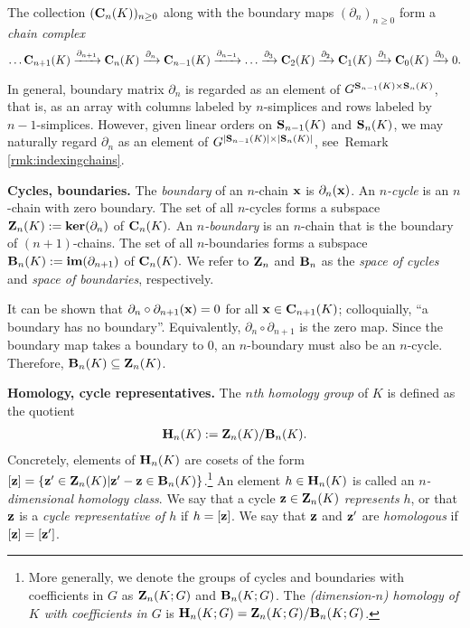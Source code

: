  
The collection  $(\mathbf{C}_n(K))_{n\geq 0}$ along with the boundary maps $(\partial_n)_{n\geq 0}$ form a \textit{chain complex}
\[\ldots \mathbf{C}_{n+1}(K) \xrightarrow{\partial_{n+1}} \mathbf{C}_{n}(K) \xrightarrow{\partial_{n}} \mathbf{C}_{n-1}(K) \xrightarrow{\partial_{n-1}} \ldots \xrightarrow{\partial_3} \mathbf{C}_2(K) \xrightarrow{\partial_2} \mathbf{C}_1(K) \xrightarrow{\partial_1} \mathbf{C}_0(K) \xrightarrow{\partial_0} 0. \]
 
\begin{remark}
\label{rmk:boundarymatrixindexing}
In general, boundary matrix $\partial_n$ is regarded as an element of $G^{\mathbf{S}_{n-1}(K) \times \mathbf{S}_{n}(K)}$, that is, as an array with columns labeled by $n$-simplices and rows labeled by $n-1$-simplices.  However, given linear orders on  $\mathbf{S}_{n-1}(K)$ and $\mathbf{S}_{n}(K)$, we may naturally regard $\partial_n$ as an element of $G^{|\mathbf{S}_{n-1}(K)| \times |\mathbf{S}_{n}(K)|}$, see\ Remark \ref{rmk:indexingchains}. 
\end{remark} 


\noindent \textbf{Cycles, boundaries.}  The \emph{boundary} of an $n$-chain $\mathbf{x}$ is  $\partial_n (\mathbf{x})$.
An \textit{$n$-cycle} is an $n$-chain with zero boundary. The set of all $n$-cycles forms a subspace $\mathbf{Z}_n(K) := \textbf{ker}(\partial_n)$ of $\mathbf{C}_n(K).$ An \textit{$n$-boundary} is an $n$-chain that is the boundary of $(n+1)$-chains. The set of all $n$-boundaries forms a subspace $\mathbf{B}_n(K):= \textbf{im}(\partial_{n+1})$ of $\mathbf{C}_n(K).$   We refer to $\mathbf{Z}_n$ and $\mathbf{B}_n$ as the \emph{space of cycles} and \emph{space of boundaries}, respectively.

It can be shown that $\partial_n \circ \partial_{n+1}(\mathbf{x}) = 0$ for all $\mathbf{x} \in \mathbf{C}_{n+1}(K)$; colloquially,  ``a boundary has no boundary''. Equivalently,  $\partial_n \circ \partial_{n+1}$ is the zero map.
Since the boundary map takes a boundary to $0$, an $n$-boundary must also be an $n$-cycle. Therefore, $\mathbf{B}_n(K) \subseteq \mathbf{Z}_n(K)$. 




\noindent \textbf{Homology, cycle representatives.} The \emph{$n$th homology group} of $K$ is defined as  the quotient
    \begin{align*}
        \mathbf{H}_n(K): = \mathbf{Z}_n(K) / \mathbf{B}_n(K).
    \end{align*}
Concretely, elements of $\mathbf{H}_n(K)$ are cosets of the form $[{\mathbf z}] = \{ {\mathbf z}'  \in \mathbf{Z}_n(K) | {\mathbf z}' - {\mathbf z} \in \mathbf{B}_n(K)\}$.\footnote{More generally, we denote the groups of cycles and boundaries with coefficients in $G$ as $\mathbf{Z}_n(K; G)$ and $\mathbf{B}_n(K; G)$.  The \emph{(dimension-$n$) homology of $K$ with coefficients in $G$} is $\mathbf{H}_n(K; G) = \mathbf{Z}_n(K; G) / \mathbf{B}_n(K; G)$.}  An element $h \in \mathbf{H}_n(K)$ is called an \emph{$n$-dimensional homology class}.  We say that a cycle ${\mathbf z} \in \mathbf{Z}_n(K)$ \emph{represents} $h$, or that ${\mathbf z}$ is a \emph{cycle representative of $h$} if $h = [{\mathbf z}]$.  We say that ${\mathbf z}$ and ${\mathbf z}'$ are \emph{homologous} if $[{\mathbf z}] = [{\mathbf z}']$.

